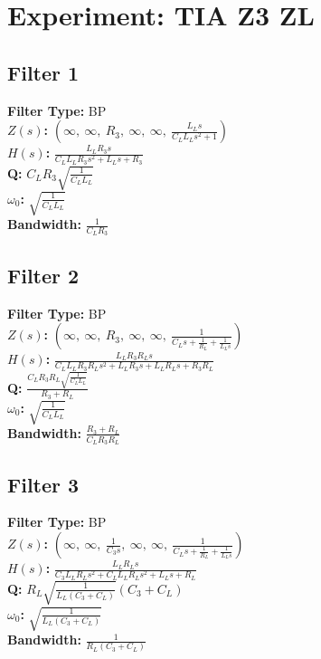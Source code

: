 \documentclass{article}
\begin{document}
        \section*{Experiment: TIA Z3 ZL}
\subsection*{Filter 1}
\textbf{Filter Type:} BP \\ 
\textbf{$Z(s)$:} $\left( \infty, \  \infty, \  R_{3}, \  \infty, \  \infty, \  \frac{L_{L} s}{C_{L} L_{L} s^{2} + 1}\right)$ \\ 
\textbf{$H(s)$:} $\frac{L_{L} R_{3} s}{C_{L} L_{L} R_{3} s^{2} + L_{L} s + R_{3}}$ \\ 
\textbf{Q:} $C_{L} R_{3} \sqrt{\frac{1}{C_{L} L_{L}}}$ \\ 
\textbf{$\omega_0$:} $\sqrt{\frac{1}{C_{L} L_{L}}}$ \\ 
\textbf{Bandwidth:} $\frac{1}{C_{L} R_{3}}$ \\ 
\subsection*{Filter 2}
\textbf{Filter Type:} BP \\ 
\textbf{$Z(s)$:} $\left( \infty, \  \infty, \  R_{3}, \  \infty, \  \infty, \  \frac{1}{C_{L} s + \frac{1}{R_{L}} + \frac{1}{L_{L} s}}\right)$ \\ 
\textbf{$H(s)$:} $\frac{L_{L} R_{3} R_{L} s}{C_{L} L_{L} R_{3} R_{L} s^{2} + L_{L} R_{3} s + L_{L} R_{L} s + R_{3} R_{L}}$ \\ 
\textbf{Q:} $\frac{C_{L} R_{3} R_{L} \sqrt{\frac{1}{C_{L} L_{L}}}}{R_{3} + R_{L}}$ \\ 
\textbf{$\omega_0$:} $\sqrt{\frac{1}{C_{L} L_{L}}}$ \\ 
\textbf{Bandwidth:} $\frac{R_{3} + R_{L}}{C_{L} R_{3} R_{L}}$ \\ 
\subsection*{Filter 3}
\textbf{Filter Type:} BP \\ 
\textbf{$Z(s)$:} $\left( \infty, \  \infty, \  \frac{1}{C_{3} s}, \  \infty, \  \infty, \  \frac{1}{C_{L} s + \frac{1}{R_{L}} + \frac{1}{L_{L} s}}\right)$ \\ 
\textbf{$H(s)$:} $\frac{L_{L} R_{L} s}{C_{3} L_{L} R_{L} s^{2} + C_{L} L_{L} R_{L} s^{2} + L_{L} s + R_{L}}$ \\ 
\textbf{Q:} $R_{L} \sqrt{\frac{1}{L_{L} \left(C_{3} + C_{L}\right)}} \left(C_{3} + C_{L}\right)$ \\ 
\textbf{$\omega_0$:} $\sqrt{\frac{1}{L_{L} \left(C_{3} + C_{L}\right)}}$ \\ 
\textbf{Bandwidth:} $\frac{1}{R_{L} \left(C_{3} + C_{L}\right)}$ \\ 
\end{document}
